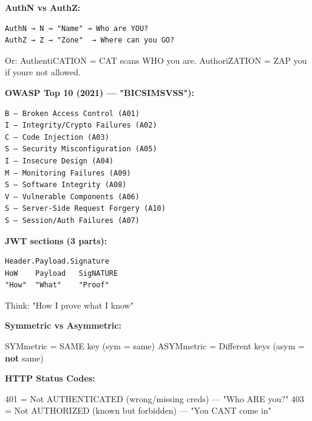 \documentclass[11pt]{article}
\newenvironment{Shaded}{\begin{snugshade}}{\end{snugshade}}
\newcommand{\DecValTok}[1]{\textcolor[rgb]{0.96,0.45,0.00}{#1}}
\newcommand{\KeywordTok}[1]{\textcolor[rgb]{0.81,0.81,0.76}{\textbf{#1}}}
\newcommand{\NormalTok}[1]{\textcolor[rgb]{0.81,0.81,0.76}{#1}}
\newcommand{\OperatorTok}[1]{\textcolor[rgb]{0.81,0.81,0.76}{#1}}
\newcommand{\StringTok}[1]{\textcolor[rgb]{0.96,0.31,0.31}{#1}}
\begin{document}
\textbf{AuthN vs AuthZ:}

\setcodelang{}

\begin{verbatim}
AuthN → N → "Name" → Who are YOU?
AuthZ → Z → "Zone"  → Where can you GO?
\end{verbatim}

Or: AuthentiCATION = CAT scans WHO you are. AuthoriZATION = ZAP you if you\textquotesingle re not allowed.

\textbf{OWASP Top 10 (2021) --- "BICSIMSVSS"):}

\setcodelang{}

\begin{verbatim}
B — Broken Access Control (A01)
I — Integrity/Crypto Failures (A02)
C — Code Injection (A03)
S — Security Misconfiguration (A05)
I — Insecure Design (A04)
M — Monitoring Failures (A09)
S — Software Integrity (A08)
V — Vulnerable Components (A06)
S — Server-Side Request Forgery (A10)
S — Session/Auth Failures (A07)
\end{verbatim}

\textbf{JWT sections (3 parts):}

\setcodelang{}

\begin{verbatim}
Header.Payload.Signature
HoW    Payload   SigNATURE
"How"  "What"    "Proof"
\end{verbatim}

Think: "How I prove what I know"

\textbf{Symmetric vs Asymmetric:}


\begin{Shaded}
\begin{Highlighting}[]
\NormalTok{SYMmetric  }\OperatorTok{=}\NormalTok{ SAME key (sym }\OperatorTok{=}\NormalTok{ same)}
\NormalTok{ASYMmetric }\OperatorTok{=}\NormalTok{ Different keys (asym }\OperatorTok{=} \KeywordTok{not}\NormalTok{ same)}
\end{Highlighting}
\end{Shaded}

\textbf{HTTP Status Codes:}


\begin{Shaded}
\begin{Highlighting}[]
\DecValTok{401} \OperatorTok{=}\NormalTok{ Not AUTHENTICATED (wrong}\OperatorTok{/}\NormalTok{missing creds) — }\StringTok{"Who ARE you?"}
\DecValTok{403} \OperatorTok{=}\NormalTok{ Not AUTHORIZED (known but forbidden)   — }\StringTok{"You CAN\textquotesingle{}T come in"}
\end{Highlighting}
\end{Shaded}
\end{document}
